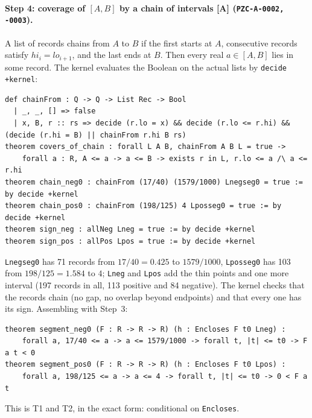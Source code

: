 \documentclass[10pt]{article}
\newcommand{\tier}[1]{\textsf{[#1]}}
\newcommand{\tA}{\tier{A}}
\newcommand{\lean}[1]{\texttt{#1}}
\renewcommand{\_}{\textunderscore\penalty0\hspace{0pt}}
\begin{document}
\paragraph{Step 4: coverage of $[A,B]$ by a chain of intervals \tA{} (\texttt{PZC-A-0002, -0003}).} A list of records chains from $A$ to $B$ if the first starts at $A$, consecutive records satisfy $hi_i=lo_{i+1}$, and the last ends at $B$. Then every real $a\in[A,B]$ lies in some record. The kernel evaluates the Boolean on the actual lists by \lean{decide +kernel}:
\begin{lstlisting}
def chainFrom : Q -> Q -> List Rec -> Bool
  | _, _, [] => false
  | x, B, r :: rs => decide (r.lo = x) && decide (r.lo <= r.hi) && (decide (r.hi = B) || chainFrom r.hi B rs)
theorem covers_of_chain : forall L A B, chainFrom A B L = true ->
    forall a : R, A <= a -> a <= B -> exists r in L, r.lo <= a /\ a <= r.hi
theorem chain_neg0 : chainFrom (17/40) (1579/1000) Lnegseg0 = true := by decide +kernel
theorem chain_pos0 : chainFrom (198/125) 4 Lposseg0 = true := by decide +kernel
theorem sign_neg : allNeg Lneg = true := by decide +kernel
theorem sign_pos : allPos Lpos = true := by decide +kernel
\end{lstlisting}
\lean{Lnegseg0} has 71 records from $17/40=0.425$ to $1579/1000$, \lean{Lposseg0} has 103 from $198/125=1.584$ to $4$; \lean{Lneg} and \lean{Lpos} add the thin points and one more interval (197 records in all, 113 positive and 84 negative). The kernel checks that the records chain (no gap, no overlap beyond endpoints) and that every one has its sign.
Assembling with Step~3:
\begin{lstlisting}
theorem segment_neg0 (F : R -> R -> R) (h : Encloses F t0 Lneg) :
    forall a, 17/40 <= a -> a <= 1579/1000 -> forall t, |t| <= t0 -> F a t < 0
theorem segment_pos0 (F : R -> R -> R) (h : Encloses F t0 Lpos) :
    forall a, 198/125 <= a -> a <= 4 -> forall t, |t| <= t0 -> 0 < F a t
\end{lstlisting}
This is T1 and T2, in the exact form: conditional on \lean{Encloses}.
\end{document}
